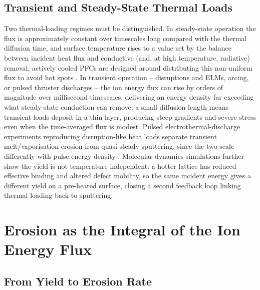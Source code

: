 \subsection{Transient and Steady-State Thermal Loads}

Two thermal-loading regimes must be distinguished. In steady-state operation the flux is approximately constant over timescales long compared with the thermal diffusion time, and surface temperature rises to a value set by the balance between incident heat flux and conductive (and, at high temperature, radiative) removal; actively cooled PFCs are designed around distributing this non-uniform flux to avoid hot spots \cite{ref0581}. In transient operation -- disruptions and ELMs, arcing, or pulsed thruster discharges -- the ion energy flux can rise by orders of magnitude over millisecond timescales, delivering an energy density far exceeding what steady-state conduction can remove; a small diffusion length means transient loads deposit in a thin layer, producing steep gradients and severe stress even when the time-averaged flux is modest. Pulsed electrothermal-discharge experiments reproducing disruption-like heat loads separate transient melt/vaporisation erosion from quasi-steady sputtering, since the two scale differently with pulse energy density \cite{ref0176}. Molecular-dynamics simulations further show the yield is not temperature-independent: a hotter lattice has reduced effective binding and altered defect mobility, so the same incident energy gives a different yield on a pre-heated surface, closing a second feedback loop linking thermal loading back to sputtering.

\section{Erosion as the Integral of the Ion Energy Flux}
\label{sec:pmi-erosion-integral}

\subsection{From Yield to Erosion Rate}

